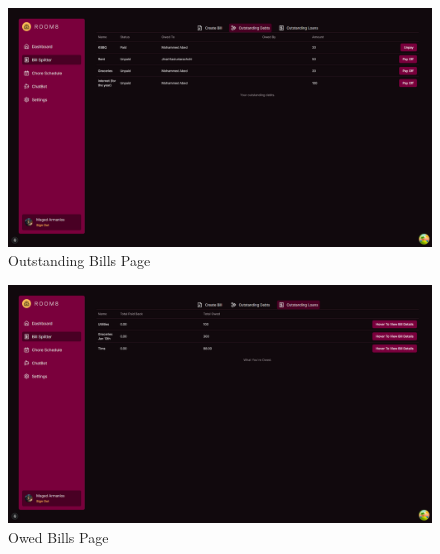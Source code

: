 \documentclass[12pt, titlepage]{article}
\begin{document}
\begin{figure}[H]
  \centering
  \includegraphics[width=\textwidth]{outstandingBills.png}
  \caption{Outstanding Bills Page}
  \label{fig:landing}
\end{figure}
\begin{figure}[H]
  \centering
  \includegraphics[width=\textwidth]{owedBills.png}
  \caption{Owed Bills Page}
  \label{fig:landing}
\end{figure}
\end{document}
